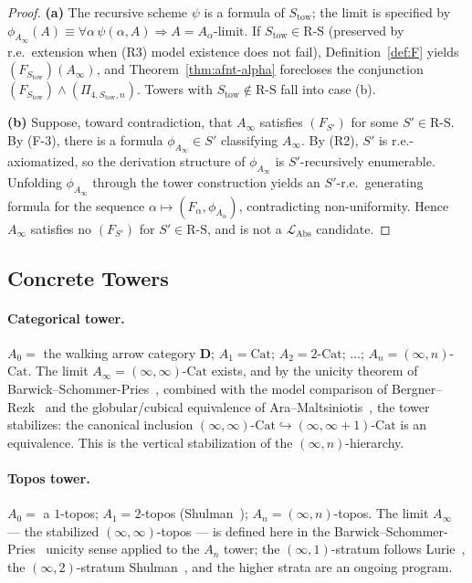 \documentclass[11pt]{article}
\theoremstyle{plain}
\theoremstyle{definition}
\newcommand{\RS}{\mathrm{R\text{-}S}}
\newcommand{\LAbs}{\mathcal{L}_{\mathrm{Abs}}}
\newcommand{\Cat}{\mathrm{Cat}}
\begin{document}
\begin{proof}
\textbf{(a)} The recursive scheme $\psi$ is a formula of $S_{\mathrm{tow}}$; the limit is specified by $\phi_{A_\infty}(A) \equiv \forall \alpha\,\psi(\alpha, A) \Rightarrow A = A_\alpha\text{-limit}$. If $S_{\mathrm{tow}} \in \RS$ (preserved by r.e.\ extension when (R3) model existence does not fail), Definition~\ref{def:F} yields $(F_{S_{\mathrm{tow}}})(A_\infty)$, and Theorem~\ref{thm:afnt-alpha} forecloses the conjunction $(F_{S_{\mathrm{tow}}}) \wedge (\Pi_{4, S_{\mathrm{tow}}, n})$. Towers with $S_{\mathrm{tow}} \notin \RS$ fall into case (b).

\textbf{(b)} Suppose, toward contradiction, that $A_\infty$ satisfies $(F_{S'})$ for some $S' \in \RS$. By (F-3), there is a formula $\phi_{A_\infty} \in S'$ classifying $A_\infty$. By (R2), $S'$ is r.e.-axiomatized, so the derivation structure of $\phi_{A_\infty}$ is $S'$-recursively enumerable. Unfolding $\phi_{A_\infty}$ through the tower construction yields an $S'$-r.e.\ generating formula for the sequence $\alpha \mapsto (F_\alpha, \phi_{A_\alpha})$, contradicting non-uniformity. Hence $A_\infty$ satisfies no $(F_{S'})$ for $S' \in \RS$, and is not a $\LAbs$ candidate.
\end{proof}

\subsection{Concrete Towers}

\paragraph{Categorical tower.} $A_0 = $ the walking arrow category $\mathbf{D}$; $A_1 = \Cat$; $A_2 = 2\text{-}\Cat$; $\ldots$; $A_n = (\infty, n)$-$\Cat$. The limit $A_\infty = (\infty, \infty)$-$\Cat$ exists, and by the unicity theorem of Barwick--Schommer-Pries~\cite{BarwickSchommerPries2021}, combined with the model comparison of Bergner--Rezk~\cite{BergnerRezk2013} and the globular/cubical equivalence of Ara--Maltsiniotis~\cite{AraMaltsiniotis2017}, the tower stabilizes: the canonical inclusion $(\infty, \infty)\text{-}\Cat \hookrightarrow (\infty, \infty+1)\text{-}\Cat$ is an equivalence. This is the vertical stabilization of the $(\infty, n)$-hierarchy.

\paragraph{Topos tower.} $A_0 = $ a $1$-topos; $A_1 = 2$-topos (Shulman~\cite{Shulman2008}); $A_n = (\infty, n)$-topos. The limit $A_\infty$ — the stabilized $(\infty, \infty)$-topos — is defined here in the Barwick--Schommer-Pries~\cite{BarwickSchommerPries2021} unicity sense applied to the $A_n$ tower; the $(\infty, 1)$-stratum follows Lurie~\cite{LurieHTT}, the $(\infty, 2)$-stratum Shulman~\cite{Shulman2008}, and the higher strata are an ongoing program.
\end{document}
